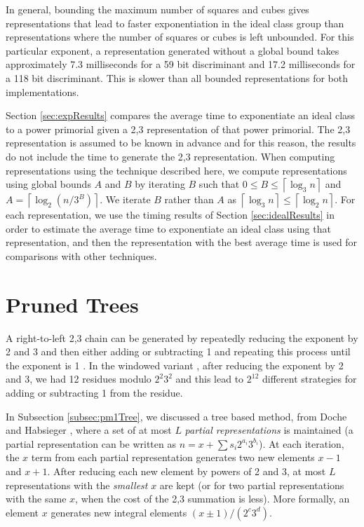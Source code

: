 \documentclass{ucalgthes1}
\theoremstyle{definition}
\newcommand{\ceil}[1]{\left\lceil #1 \right\rceil}
\begin{document}
In general, bounding the maximum number of squares and cubes gives representations that lead to faster exponentiation in the ideal class group than representations where the number of squares or cubes is left unbounded.  For this particular exponent, a representation generated without a global bound takes approximately 7.3 milliseconds for a 59 bit discriminant and 17.2 milliseconds for a 118 bit discriminant.  This is slower than all bounded representations for both implementations.

Section \ref{sec:expResults} compares the average time to exponentiate an ideal class to a power primorial given a 2,3 representation of that power primorial.  The 2,3 representation is assumed to be known in advance and for this reason, the results do not include the time to generate the 2,3 representation.  When computing representations using the technique described here, we compute representations using global bounds $A$ and $B$ by iterating $B$ such that $0 \le B \le \ceil{\log_3 n}$ and $A = \ceil{\log_2 (n/3^B)}$.  We iterate $B$ rather than $A$ as $\ceil{\log_3 n} \le \ceil{\log_2 n}$.  For each representation, we use the timing results of Section \ref{sec:idealResults} in order to estimate the average time to exponentiate an ideal class using that representation, and then the representation with the best average time is used for comparisons with other techniques.

\section{Pruned Trees}
\label{sec:expGreedyTrees}

A right-to-left 2,3 chain can be generated by repeatedly reducing the exponent by 2 and 3 and then either adding or subtracting 1 and repeating this process until the exponent is 1 \cite[Figure 8]{Ciet2006}.  In the windowed variant \cite{Doche2006}, after reducing the exponent by 2 and 3, we had 12 residues modulo $2^2 3^2$ and this lead to $2^{12}$ different strategies for adding or subtracting 1 from the residue.

In Subsection \ref{subsec:pm1Tree}, we discussed a tree based method, from Doche and Habsieger \cite{Doche2008}, where a set of at most $L$ \emph{partial representations} is maintained (a partial representation can be written as $n = x + \sum s_i2^{a_i}3^{b_i}$).  At each iteration, the $x$ term from each partial representation generates two new elements $x-1$ and $x+1$.  After reducing each new element by powers of 2 and 3, at most $L$ representations with the \emph{smallest} $x$ are kept (or for two partial representations with the same $x$, when the cost of the 2,3 summation is less).  More formally, an element $x$ generates new integral elements $(x \pm 1)/(2^c3^d)$.
\end{document}
